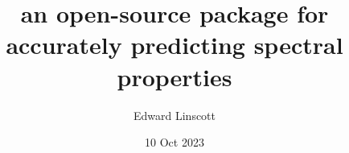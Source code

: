 \documentclass[xcolor=table,aspectratio=169]{beamer}
\title{\noindent\large{an open-source package for accurately predicting spectral properties}}
\author{Edward Linscott}
\institute{EPFL}
\date{10 Oct 2023}
\newcommand\blfootcite[1]{%
  \begingroup
  \renewcommand\thefootnote{}\footnote{\hspace{-4ex}\cite{#1}}%
  \addtocounter{footnote}{-1}%
  \endgroup
}
\newcommand{\braopket}[3]{\langle #1|#2|#3\rangle}
\numberwithin{equation}{section}
\begin{document}
\frame{\titlepage}

% 
% 
% 
% 
\end{document}
